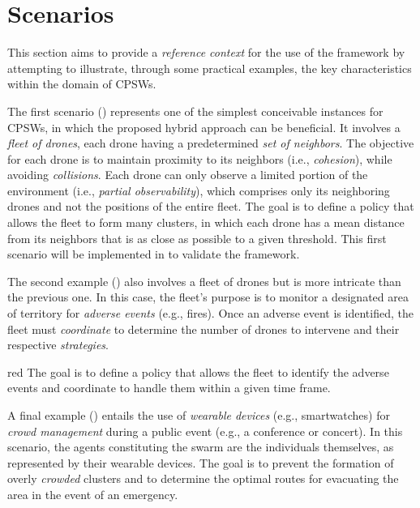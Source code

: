\documentclass[12pt,a4paper,openright,twoside]{book}
\begin{document}
\section{Scenarios}
This section aims to provide a \emph{reference context} for the use of the framework by attempting to illustrate, 
    through some practical examples, the key characteristics within the domain of CPSWs.

The first scenario () represents one of the simplest conceivable instances for CPSWs, in which the proposed hybrid 
    approach can be beneficial. It involves a \emph{fleet of drones}, each drone having a predetermined \emph{set of neighbors}. 
    The objective for each drone is to maintain proximity to its neighbors (i.e., \emph{cohesion}), while avoiding \emph{collisions}.
    Each drone can only observe a limited portion of the environment (i.e., \emph{partial observability}), which comprises only its 
    neighboring drones and not the positions of the entire fleet.
    The goal is to define a policy that allows the fleet to form many clusters, in which each drone
    has a mean distance from its neighbors that is as close as possible to a given threshold. 
    This first scenario will be implemented in  to validate the framework.

    The second example () also involves a fleet of drones but is more intricate than the previous one. In this case, 
    the fleet's purpose is to monitor a designated area of territory for \emph{adverse events} (e.g., fires). Once an adverse 
    event is identified, the fleet must \emph{coordinate} to determine the number of drones to intervene and their 
    respective \emph{strategies}.
    \begin{color}{red}
    The goal is to define a policy that allows the fleet to identify the adverse events and coordinate to handle them within a 
    given time frame.
    \end{color}

A final example () entails the use of \emph{wearable devices} (e.g., smartwatches) for \emph{crowd management} during a public event 
    (e.g., a conference or concert).
    In this scenario, the agents constituting the swarm are the individuals themselves, as represented by their wearable devices. 
    The goal is to prevent the formation of overly \emph{crowded} clusters and to determine the optimal routes 
    for evacuating the area in the event of an emergency.
\end{document}

